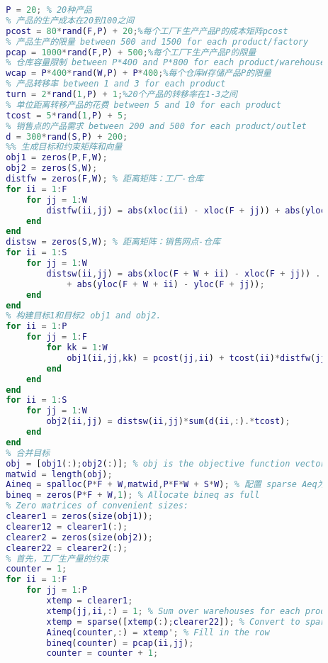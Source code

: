 \begin{lstlisting}[language = Matlab]
        %% 生成随机容量,成本,和需求
        P = 20; % 20种产品
        % 产品的生产成本在20到100之间
        pcost = 80*rand(F,P) + 20;%每个工厂F生产产品P的成本矩阵pcost
        % 产品生产的限量 between 500 and 1500 for each product/factory
        pcap = 1000*rand(F,P) + 500;%每个工厂F生产产品P的限量
        % 仓库容量限制 between P*400 and P*800 for each product/warehouse
        wcap = P*400*rand(W,P) + P*400;%每个仓库W存储产品P的限量
        % 产品转移率 between 1 and 3 for each product
        turn = 2*rand(1,P) + 1;%20个产品的转移率在1-3之间
        % 单位距离转移产品的花费 between 5 and 10 for each product
        tcost = 5*rand(1,P) + 5;
        % 销售点的产品需求 between 200 and 500 for each product/outlet
        d = 300*rand(S,P) + 200;
        %% 生成目标和约束矩阵和向量
        obj1 = zeros(P,F,W);
        obj2 = zeros(S,W);
        distfw = zeros(F,W); % 距离矩阵：工厂-仓库
        for ii = 1:F
            for jj = 1:W
                distfw(ii,jj) = abs(xloc(ii) - xloc(F + jj)) + abs(yloc(ii) - yloc(F + jj));
            end
        end
        distsw = zeros(S,W); % 距离矩阵：销售网点-仓库
        for ii = 1:S
            for jj = 1:W
                distsw(ii,jj) = abs(xloc(F + W + ii) - xloc(F + jj)) ...
                    + abs(yloc(F + W + ii) - yloc(F + jj));
            end
        end
        % 构建目标1和目标2 obj1 and obj2.
        for ii = 1:P
            for jj = 1:F
                for kk = 1:W
                    obj1(ii,jj,kk) = pcost(jj,ii) + tcost(ii)*distfw(jj,kk);
                end
            end
        end
        for ii = 1:S
            for jj = 1:W
                obj2(ii,jj) = distsw(ii,jj)*sum(d(ii,:).*tcost);
            end
        end
        % 合并目标
        obj = [obj1(:);obj2(:)]; % obj is the objective function vector
        matwid = length(obj);
        Aineq = spalloc(P*F + W,matwid,P*F*W + S*W); % 配置 sparse Aeq为非零元素配置内存
        bineq = zeros(P*F + W,1); % Allocate bineq as full
        % Zero matrices of convenient sizes:
        clearer1 = zeros(size(obj1));
        clearer12 = clearer1(:);
        clearer2 = zeros(size(obj2));
        clearer22 = clearer2(:);
        % 首先，工厂生产量的约束
        counter = 1;
        for ii = 1:F
            for jj = 1:P
                xtemp = clearer1;
                xtemp(jj,ii,:) = 1; % Sum over warehouses for each product and factory为每个产品和工厂仓库求和
                xtemp = sparse([xtemp(:);clearer22]); % Convert to sparse
                Aineq(counter,:) = xtemp'; % Fill in the row
                bineq(counter) = pcap(ii,jj);
                counter = counter + 1;

\end{lstlisting}
